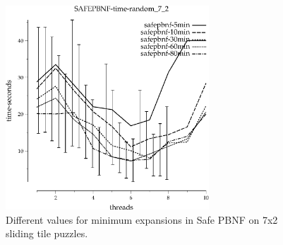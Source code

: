 \documentclass{article}
\begin{document}
\begin{appendices}
\begin{figure}[h!]
\includegraphics[width=3in]{../graphs/tiles_random_7_2/SAFEPBNF-time-random_7_2.eps}
\caption{Different values for minimum expansions in Safe PBNF on 7x2 sliding tile puzzles.}
\label{fig:SafePBNF-tile}
\end{figure}
\end{appendices}
\end{document}
